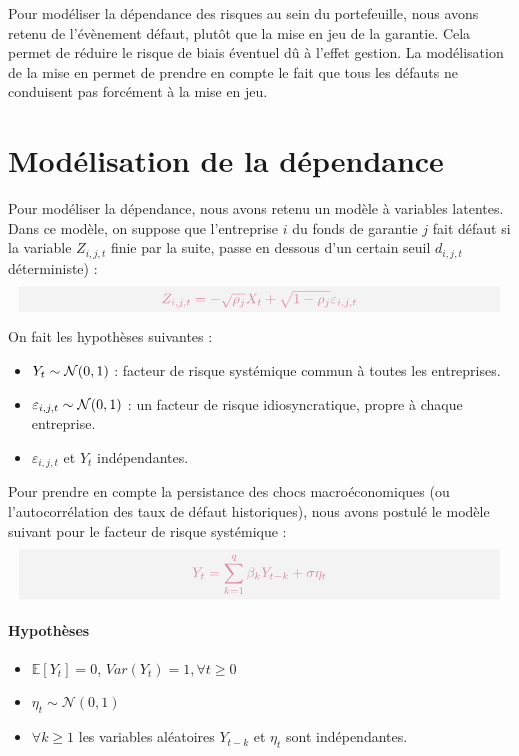 \documentclass[12pt,a4paper]{report}
\begin{document}
Pour modéliser la dépendance des risques au sein du portefeuille, nous avons retenu de l’évènement défaut, plutôt que la mise en jeu de la garantie. Cela permet de réduire le risque de biais éventuel dû à l’effet gestion.
La modélisation de la mise en permet de prendre en compte le fait que tous les défauts ne conduisent pas forcément à la mise en jeu.

\section{Modélisation de la dépendance}

Pour modéliser la dépendance, nous avons retenu un modèle à variables latentes. Dans ce modèle, on suppose que l’entreprise $i$ du fonds de garantie $j$ fait défaut si la variable $Z_{i,j,t}$ finie par la suite, passe en dessous d’un certain seuil $d_{i,j,t}$ déterministe) :
\[
\boxedb{Z_{i,j,t} = -\sqrt{\rho_j}X_t + \sqrt{1-\rho_j}\varepsilon_{i,j,t}}
\]

On fait les hypothèses suivantes :
\begin{itemize}
    \item $Y_t \sim \mathcal{N}(0,1)$ : facteur de risque systémique commun à toutes les entreprises.
    \item $\varepsilon_{i,j,t}\sim\mathcal{N}(0,1)$ : un facteur de risque idiosyncratique, propre à chaque entreprise.
    \item $\varepsilon_{i,j,t}$ et $Y_t$ indépendantes.
\end{itemize}

Pour prendre en compte la persistance des chocs macroéconomiques (ou l’autocorrélation des taux de défaut historiques), nous avons postulé le modèle suivant pour le facteur de risque systémique :
\[
\boxedb{Y_t = \sum_{k=1}^q \beta_k Y_{t-k} + \sigma\eta_t}
\]
\paragraph{Hypothèses}
\begin{itemize}
    \item $\mathbb{E}[Y_t] = 0$, $Var(Y_t) = 1, \forall t\geq 0$
    \item $\eta_t\sim \mathcal{N}(0,1)$
    \item $\forall k\geq 1$ les variables aléatoires $Y_{t-k}$ et $\eta_t$ sont indépendantes.
\end{itemize}
\end{document}
